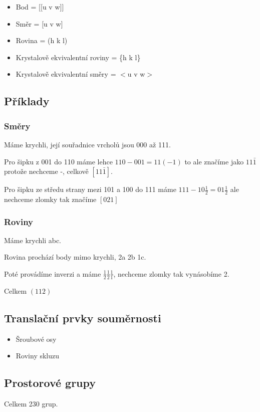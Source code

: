 \documentclass[../main.tex]{subfiles}
\begin{document}
\begin{itemize}
    \item Bod = [[u v w]]
    \item Směr = [u v w]
    \item Rovina = (h k l)
    \item Krystalově ekvivalentní roviny = \{h k l\}
    \item Krystalově ekvivalentní směry = $<$u v w$>$
\end{itemize}

\subsection{Příklady}

\subsubsection{Směry}

Máme krychli, její souřadnice vrcholů jsou 000 až 111.

Pro šipku z 001 do 110 máme lehce $110-001 = 11(-1)$ to ale značíme 
jako $11\bar{1}$ protože nechceme -, celkově $[11\bar{1}]$.


Pro šipku ze středu strany mezi 101 a 100 do 111 máme $111 - 10\frac{1}{2} = 0 1 \frac{1}{2}$ ale 
nechceme zlomky tak značíme $[021]$


\subsubsection{Roviny}
Máme krychli abc. 

Rovina prochází body mimo krychli, 2a 2b 1c.

Poté provádíme inverzi a máme $\frac{1}{2}\frac{1}{2}\frac{1}{1}$, nechceme zlomky tak vynásobíme 2.

Celkem $(112)$

\subsection{Translační prvky souměrnosti}
\begin{itemize}
    \item Šroubové osy
    \item Roviny skluzu
\end{itemize}



\subsection{Prostorové grupy}

Celkem 230 grup. 
\end{document}

